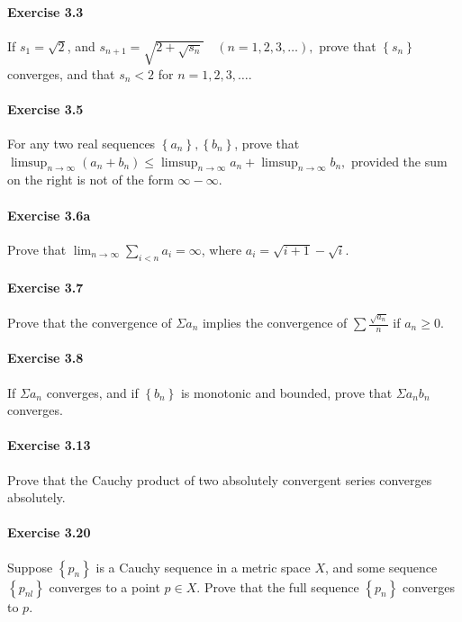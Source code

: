 \documentclass{article}
\begin{document}
\paragraph{Exercise 3.3} If $s_{1}=\sqrt{2}$, and $s_{n+1}=\sqrt{2+\sqrt{s_{n}}} \quad(n=1,2,3, \ldots),$ prove that $\left\{s_{n}\right\}$ converges, and that $s_{n}<2$ for $n=1,2,3, \ldots$.

\paragraph{Exercise 3.5} For any two real sequences $\left\{a_{n}\right\},\left\{b_{n}\right\}$, prove that $\limsup _{n \rightarrow \infty}\left(a_{n}+b_{n}\right) \leq \limsup _{n \rightarrow \infty} a_{n}+\limsup _{n \rightarrow \infty} b_{n},$ provided the sum on the right is not of the form $\infty-\infty$.

\paragraph{Exercise 3.6a} Prove that $\lim_{n \rightarrow \infty} \sum_{i<n} a_i = \infty$, where $a_i = \sqrt{i + 1} -\sqrt{i}$.

\paragraph{Exercise 3.7} Prove that the convergence of $\Sigma a_{n}$ implies the convergence of $\sum \frac{\sqrt{a_{n}}}{n}$ if $a_n\geq 0$.

\paragraph{Exercise 3.8} If $\Sigma a_{n}$ converges, and if $\left\{b_{n}\right\}$ is monotonic and bounded, prove that $\Sigma a_{n} b_{n}$ converges.

\paragraph{Exercise 3.13} Prove that the Cauchy product of two absolutely convergent series converges absolutely.

\paragraph{Exercise 3.20} Suppose $\left\{p_{n}\right\}$ is a Cauchy sequence in a metric space $X$, and some sequence $\left\{p_{n l}\right\}$ converges to a point $p \in X$. Prove that the full sequence $\left\{p_{n}\right\}$ converges to $p$.
\end{document}
